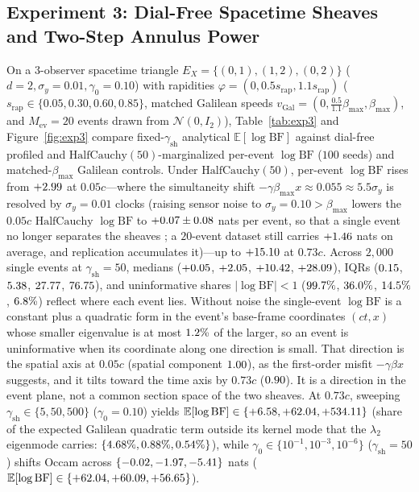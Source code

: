 \documentclass[11pt,a4paper]{article}
\theoremstyle{definition}
\theoremstyle{remark}
\newcommand{\E}{\mathbb{E}}
\newcommand{\BF}{\mathrm{BF}}
\begin{document}
\FloatBarrier
\subsection{\texorpdfstring{Experiment 3: Dial-Free Spacetime Sheaves and Two-Step Annulus Power}{Experiment 3: Dial-Free Spacetime Sheaves and Two-Step Annulus Power}}
\label{sec:exp3}

On a $3$-observer spacetime triangle $E_X = \{(0,1), (1,2), (0,2)\}$ ($d=2, \sigma_y = 0.01, \gamma_0 = 0.10$) with rapidities $\varphi = (0, 0.5 s_{\mathrm{rap}}, 1.1 s_{\mathrm{rap}})$ ($s_{\mathrm{rap}} \in \{0.05, 0.30, 0.60, 0.85\}$, matched Galilean speeds $v_{\mathrm{Gal}} = (0, \frac{0.5}{1.1}\beta_{\max}, \beta_{\max})$, and $M_{\mathrm{ev}} = 20$ events drawn from $\mathcal{N}(0, I_2)$), Table~\ref{tab:exp3} and Figure~\ref{fig:exp3} compare fixed-$\gamma_{\mathrm{sh}}$ analytical $\E[\log\BF]$ against dial-free profiled and $\mathrm{HalfCauchy}(50)$-marginalized per-event $\log\BF$ ($100$ seeds) and matched-$\beta_{\max}$ Galilean controls. Under $\mathrm{HalfCauchy}(50)$, per-event $\log\BF$ rises from $+2.99$ at $0.05c$---where the simultaneity shift $-\gamma\beta_{\max} x \approx 0.055 \approx 5.5\sigma_y$ is resolved by $\sigma_y = 0.01$ clocks (raising sensor noise to $\sigma_y = 0.10 > \beta_{\max}$ lowers the $0.05c$ $\mathrm{HalfCauchy}$ $\log\BF$ to $+0.07 \pm 0.08$ nats per event, so that a single event no longer separates the sheaves \cite{nozick2001invariances}; a $20$-event dataset still carries $+1.46$ nats on average, and replication accumulates it)---up to $+15.10$ at $0.73c$. Across $2{,}000$ single events at $\gamma_{\mathrm{sh}} = 50$, medians ($+0.05$, $+2.05$, $+10.42$, $+28.09$), IQRs ($0.15$, $5.38$, $27.77$, $76.75$), and uninformative shares $|\log\BF|<1$ ($99.7\%$, $36.0\%$, $14.5\%$, $6.8\%$) reflect where each event lies. Without noise the single-event $\log\BF$ is a constant plus a quadratic form in the event's base-frame coordinates $(ct, x)$ whose smaller eigenvalue is at most $1.2\%$ of the larger, so an event is uninformative when its coordinate along one direction is small. That direction is the spatial axis at $0.05c$ (spatial component $1.00$), as the first-order misfit $-\gamma\beta x$ suggests, and it tilts toward the time axis by $0.73c$ ($0.90$). It is a direction in the event plane, not a common section space of the two sheaves. At $0.73c$, sweeping $\gamma_{\mathrm{sh}} \in \{5, 50, 500\}$ ($\gamma_0 = 0.10$) yields $\E[\log\BF] \in \{\resSwGshFiveBF, \resSwGshFiftyBF, \resSwGshFiveHundBF\}$ (share of the expected Galilean quadratic term outside its kernel mode that the $\lambda_2$ eigenmode carries: $\{4.68\%, 0.88\%, 0.54\%\}$), while $\gamma_0 \in \{10^{-1}, 10^{-3}, 10^{-6}\}$ ($\gamma_{\mathrm{sh}}=50$) shifts Occam across $\{-0.02, -1.97, -5.41\}$ nats ($\E[\log\BF] \in \{\resSwGzeroTenthBF, \resSwGzeroMilliBF, \resSwGzeroMicroBF\}$).
\end{document}
